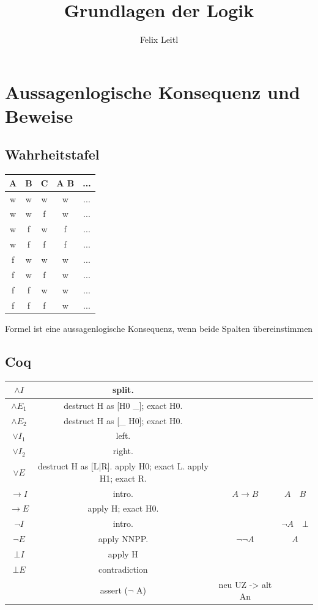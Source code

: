 \documentclass{article}
\title{Grundlagen der Logik}
\author{Felix Leitl}
\begin{document}
	\maketitle
	\newpage
	\section{Aussagenlogische Konsequenz und Beweise}
		\subsection{Wahrheitstafel}
			\begin{center}
				\begin{tabular}{c|c|c|c|c}
					A & B & C & A \to B & ...\\
					\hline
					w & w & w & w & ...\\
					\hline
					w & w & f & w & ...\\
					\hline
					w & f & w & f & ...\\
					\hline
					w & f & f & f & ...\\
					\hline
					f & w & w & w & ...\\ 
					\hline
					f & w & f & w & ...\\
					\hline
					f & f & w & w & ...\\
					\hline
					f & f & f & w & ...
				\end{tabular}
			\end{center}
		Formel ist eine aussagenlogische Konsequenz, wenn beide Spalten übereinstimmen
		\subsection{Coq}
			\begin{center}
				\begin{tabular} {c|c|c|c}
					$\land I$ & split. &  \\
					\hline
					$\land E_1$ & destruct H as [H0 \_]; exact H0. &  \\
					\hline
					$\land E_2$ & destruct H as [\_ H0]; exact H0. &  \\
					\hline
					$\lor I_1$ & left. &  \\
					\hline
					$\lor I_2$ & right. &  \\
					\hline
					$\lor E$ & destruct H as [L|R]. apply H0; exact L. apply H1; exact R. \\
					\hline
					$\to I$ & intro. & $A \to B$ & $A \quad B$ \\
					\hline
					$\to E$ & apply H; exact H0. &  \\
					\hline
					$\lnot I$ & intro. & & $\lnot A \quad \bot$ \\ 
					\hline
					$\lnot E$ & apply NNPP. & $\lnot\lnot A$ & $A$ \\
					\hline
					$\bot I$ & apply H & & \\
					\hline
					$\bot E$ & contradiction & & \\
					\hline
					& assert ($\lnot$ A) &  neu UZ -> alt An 
				\end{tabular}
			\end{center}
\end{document}
